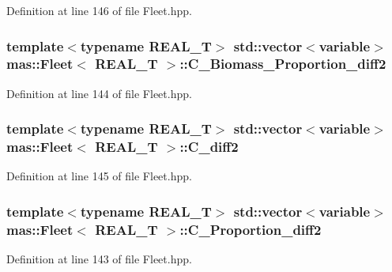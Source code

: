 Definition at line 146 of file Fleet.\-hpp.

\hypertarget{structmas_1_1_fleet_ac54bf241532c1f1a5859317484f54699}{
\subsubsection[{C\-\_\-\-Biomass\-\_\-\-Proportion\-\_\-diff2}]{\setlength{\rightskip}{0pt plus 5cm}template$<$typename R\-E\-A\-L\-\_\-\-T$>$ std\-::vector$<${\bf variable}$>$ {\bf mas\-::\-Fleet}$<$ R\-E\-A\-L\-\_\-\-T $>$\-::C\-\_\-\-Biomass\-\_\-\-Proportion\-\_\-diff2}}\label{structmas_1_1_fleet_ac54bf241532c1f1a5859317484f54699}


Definition at line 144 of file Fleet.\-hpp.

\hypertarget{structmas_1_1_fleet_adaf77725042f3af5dbdb9a73aa506f4b}{
\subsubsection[{C\-\_\-diff2}]{\setlength{\rightskip}{0pt plus 5cm}template$<$typename R\-E\-A\-L\-\_\-\-T$>$ std\-::vector$<${\bf variable}$>$ {\bf mas\-::\-Fleet}$<$ R\-E\-A\-L\-\_\-\-T $>$\-::C\-\_\-diff2}}\label{structmas_1_1_fleet_adaf77725042f3af5dbdb9a73aa506f4b}


Definition at line 145 of file Fleet.\-hpp.

\hypertarget{structmas_1_1_fleet_a6ec61ed407b54fc36001cd7052f2493a}{
\subsubsection[{C\-\_\-\-Proportion\-\_\-diff2}]{\setlength{\rightskip}{0pt plus 5cm}template$<$typename R\-E\-A\-L\-\_\-\-T$>$ std\-::vector$<${\bf variable}$>$ {\bf mas\-::\-Fleet}$<$ R\-E\-A\-L\-\_\-\-T $>$\-::C\-\_\-\-Proportion\-\_\-diff2}}\label{structmas_1_1_fleet_a6ec61ed407b54fc36001cd7052f2493a}


Definition at line 143 of file Fleet.\-hpp.

